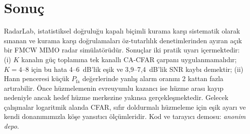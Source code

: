 \documentclass[conference,a4paper,10pt]{IEEEtran}
\newcommand{\Pfa}{P_{\mathrm{fa}}}
\begin{document}
\section{Sonuç}
RadarLab, istatistiksel doğruluğu kapalı biçimli kurama karşı sistematik olarak sınanan ve kurama karşı doğrulamaları öz-tutarlılık denetimlerinden ayıran açık bir FMCW MIMO radar simülatörüdür. Sonuçlar iki pratik uyarı içermektedir: (i) $K$ kanalın güç toplamına tek kanallı CA-CFAR çarpanı uygulanmamalıdır; $K=4$--$8$ için bu hata 4--6~dB'lik eşik ve 3,9--7,4~dB'lik SNR kaybı demektir; (ii) Hann penceresi küçük $\Pfa$ değerlerinde yanlış alarm oranını 2 kattan fazla artırabilir. Önce hüzmelemenin evreuyumlu kazancı ise hüzme arası kayıp nedeniyle ancak hedef hüzme merkezine yakınsa gerçekleşmektedir. Gelecek çalışmalar logaritmik alanda CFAR, sıfır doldurmalı hüzmeleme için eşik ayarı ve kendi donanımımızla köşe yansıtıcı ölçümleridir. Kod ve tarayıcı demosu: \emph{anonim depo}.




\end{document}
